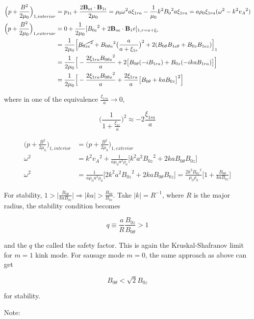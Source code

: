 \documentclass[
  notoc %
]{tufte-book}
\begin{document}
\[
\begin{aligned}
\Big( p+\frac{B^2}{2\mu_0}\Big)_{1,interior} &= p_{1i} + \frac{2\mathbf{B}_{oi}\cdot\mathbf{B}_{1i}}{2\mu_0}=\rho_0\omega^2 a\xi_{1ra} - \frac{1}{\mu_0}k^2{B_0}^2a\xi_{1ra}=a\rho_0\xi_{1ra}(\omega^2-k^2{v_A}^2) \\
\Big( p+\frac{B^2}{2\mu_0}\Big)_{1,exterior}&=0+\frac{1}{2\mu_0}[{B_{0e}}^2+2\mathbf{B}_{oe}\cdot\mathbf{B}_1e]_{1,r=a+\xi_r} \\
&=\frac{1}{2\mu_0}\Big[ \cancel{{B_{0ze}}^2}+{B_{0\theta a}}^2\big( \frac{a}{a+\xi_{1r}}\big)^2+2(B_{0\theta}B_{1e\theta}+B_{0z}B_{1ez})\Big]_1 \\
&=\frac{1}{2\mu_0}\Big[ -\frac{2\xi_{1ra}{B_{0\theta a}}^2}{a}+2\big[ B_{0\theta}(-iB_{1ra})+B_{0z}(-ikaB_{1ra})\big]\Big]\\
&=\frac{1}{2\mu_0}\Big[ -\frac{2\xi_{1ra}{B_{0\theta a}}^2}{a}+\frac{2\xi_{1ra}}{a}\big[ B_{0\theta}+kaB_{0z}\big]^2\Big]
\end{aligned}
\]

where in one of the equivalence \(\frac{\xi_{1ra}}{a}\rightarrow0\),

\[
\Big( \frac{1}{1+\frac{\xi_{1r}}{a}}\Big)^2 \approx -2\frac{\xi_{1ra}}{a}
\]

\[
\begin{aligned}
\Big( p+\frac{B^2}{2\mu_0}\Big)_{1,interior} &= \Big( p+\frac{B^2}{2\mu_0}\Big)_{1,exterior} \\
\omega^2&=k^2{v_A}^2 + \frac{1}{a\mu_0 a^2 \rho_0}\big[ k^2 a^2{B_{0z}}^2+2kaB_{0\theta}B_{0z} \big]\\
\omega^2&= \frac{1}{a\mu_0 a^2 \rho_0}\big[2 k^2 a^2{B_{0z}}^2+2kaB_{0\theta}B_{0z} \big]
=\frac{2k^2{B_{0z}}^2}{\mu_0\rho_0}\Big[ 1+\frac{B_{0\theta}}{kaB_{0z}}\Big]
\end{aligned}
\]

For stability,
\(1>\big| \frac{B_{0\theta}}{ka B_{0z}}\big|\Rightarrow |ka|>\frac{B_{0\theta}}{B_{0z}}\).
Take \(|k|=R^{-1}\), where \(R\) is the major radius, the stability
condition becomes

\[
q\equiv \frac{a}{R}\frac{B_{0z}}{B_{0\theta}}>1
\]

and the \(q\) the called the safety factor. This is again the
Kruskal-Shafranov limit for \(m=1\) kink mode. For sausage mode \(m=0\),
the same approach as above can get

\[
B_{0\theta}< \sqrt{2} B_{0z}
\]

for stability.

Note:
\end{document}
